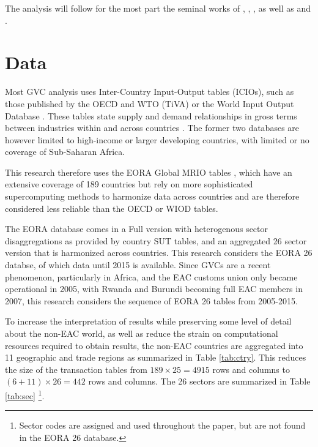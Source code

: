 \documentclass[a4paper]{article}
\begin{document}
The analysis will follow for the most part the seminal works of \citet{hummels2001nature}, \citet{koopman2014tracing}, \citet{wang2013quantifying}, as well as \citet{Kummritz20161} and \citet{Kummritz20162}. 

\section{Data}
Most GVC analysis uses Inter-Country Input-Output tables (ICIOs), such as those
published by the OECD and WTO (TiVA) or the World Input Output Database \citep{timmer2012world}. These tables state supply and demand relationships in gross terms between industries within and across countries \citep{Kummritz2014}. The former two databases are however limited to high-income or larger developing countries, with limited or no coverage of Sub-Saharan Africa. \newline

This research therefore uses the EORA Global MRIO tables \citep{lenzen2012mapping, lenzen2013building}, which have an extensive coverage of 189 countries but rely on more sophisticated supercomputing methods to harmonize data across countries and are therefore considered less reliable than the OECD or WIOD tables. \newline

The EORA database comes in a Full version with heterogenous sector disaggregations as provided by country SUT tables, and an aggregated 26 sector version that is harmonized across countries. This research considers the EORA 26 databse, of which data until 2015 is available. Since GVCs are a recent phenomenon, particularly in Africa, and the EAC customs union only became operational in 2005, with Rwanda and Burundi becoming full EAC members in 2007, this research considers the sequence of EORA 26 tables from 2005-2015. \newline

To increase the interpretation of results while preserving some level of detail about the non-EAC world, as well as reduce the strain on computational resources required to obtain results, the non-EAC countries are aggregated into 11 geographic and trade regions as summarized in Table \ref{tab:ctry}. This reduces the size of the transaction tables from $189 \times 25 = 4915$ rows and columns to $(6 + 11)\times 26 = 442$ rows and columns. The 26 sectors are summarized in Table \ref{tab:sec} \footnote{Sector codes are assigned and used throughout the paper, but are not found in the EORA 26 database.}. \newline
\end{document}
